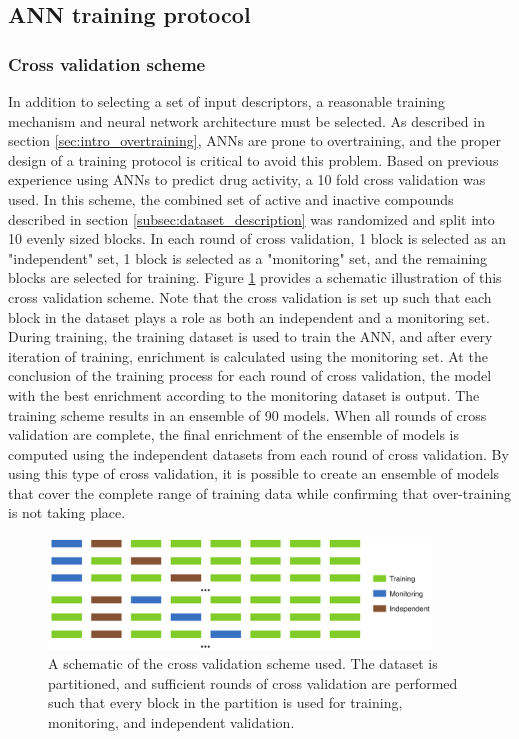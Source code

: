 \subsection{ANN training protocol}

\subsubsection{Cross validation scheme}
In addition to selecting a set of input descriptors, a reasonable training mechanism and neural network architecture must be selected.
As described in section \ref{sec:intro_overtraining}, ANNs are prone to overtraining, and the proper design of a training protocol is critical to avoid this problem.
Based on previous experience using ANNs to predict drug activity\citep{Mueller:2010dx,Mueller:2012gn,Butkiewicz:2013ka}, a 10 fold cross validation was used.
In this scheme, the combined set of active and inactive compounds described in section \ref{subsec:dataset_description} was randomized and split into 10 evenly sized blocks.
In each round of cross validation, 1 block is selected as an "independent" set, 1 block is selected as a "monitoring" set, and the remaining blocks are selected for training.
Figure \ref{fig:crossval_schematic} provides a schematic illustration of this cross validation scheme.
Note that the cross validation is set up such that each block in the dataset plays a role as both an independent and a monitoring set.
During training, the training dataset is used to train the ANN, and after every iteration of training, enrichment is calculated using the monitoring set.
At the conclusion of the training process for each round of cross validation, the model with the best enrichment according to the monitoring dataset is output.
The training scheme results in an ensemble of 90 models.
When all rounds of cross validation are complete, the final enrichment of the ensemble of models is computed using the independent datasets from each round of cross validation.
By using this type of cross validation, it is possible to create an ensemble of models that cover the complete range of training data while confirming that over-training is not taking place.
\begin{figure}
\centering
\includegraphics[width=4in]{figures/hts/cross_validation.pdf}
\caption{
A schematic of the cross validation scheme used.
The dataset is partitioned, and sufficient rounds of cross validation are performed such that every block in the partition is used for training, monitoring, and independent validation.
}
\label{fig:crossval_schematic}
\end{figure}

